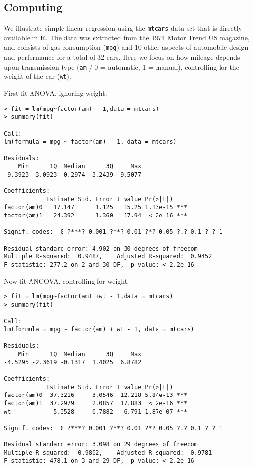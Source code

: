 \subsection{Computing}

We illustrate simple linear regression using the \texttt{mtcars} data set that is directly available in \textsf{R}. The data was extracted from the 1974 Motor Trend US magazine, and consists of gas consumption (\texttt{mpg}) and 10 other aspects of automobile design and performance for a total of 32 cars.
Here we focus on how mileage depends upon transmission type ({\texttt{am}} / 0 = automatic, 1 = manual), controlling for the weight of the car (\texttt{wt}).

First fit ANOVA, ignoring weight.
\begin{verbatim}
> fit = lm(mpg~factor(am) - 1,data = mtcars)
> summary(fit)

Call:
lm(formula = mpg ~ factor(am) - 1, data = mtcars)

Residuals:
    Min      1Q  Median      3Q     Max 
-9.3923 -3.0923 -0.2974  3.2439  9.5077 

Coefficients:
            Estimate Std. Error t value Pr(>|t|)    
factor(am)0   17.147      1.125   15.25 1.13e-15 ***
factor(am)1   24.392      1.360   17.94  < 2e-16 ***
---
Signif. codes:  0 ?***? 0.001 ?**? 0.01 ?*? 0.05 ?.? 0.1 ? ? 1

Residual standard error: 4.902 on 30 degrees of freedom
Multiple R-squared:  0.9487,	Adjusted R-squared:  0.9452 
F-statistic: 277.2 on 2 and 30 DF,  p-value: < 2.2e-16
\end{verbatim}


Now fit ANCOVA, controlling for weight.
\begin{verbatim}
> fit = lm(mpg~factor(am) +wt - 1,data = mtcars)
> summary(fit)

Call:
lm(formula = mpg ~ factor(am) + wt - 1, data = mtcars)

Residuals:
    Min      1Q  Median      3Q     Max 
-4.5295 -2.3619 -0.1317  1.4025  6.8782 

Coefficients:
            Estimate Std. Error t value Pr(>|t|)    
factor(am)0  37.3216     3.0546  12.218 5.84e-13 ***
factor(am)1  37.2979     2.0857  17.883  < 2e-16 ***
wt           -5.3528     0.7882  -6.791 1.87e-07 ***
---
Signif. codes:  0 ?***? 0.001 ?**? 0.01 ?*? 0.05 ?.? 0.1 ? ? 1

Residual standard error: 3.098 on 29 degrees of freedom
Multiple R-squared:  0.9802,	Adjusted R-squared:  0.9781 
F-statistic: 478.1 on 3 and 29 DF,  p-value: < 2.2e-16
\end{verbatim}


